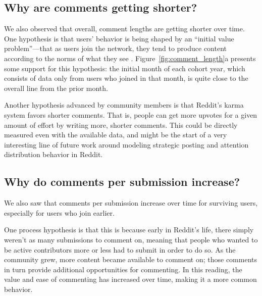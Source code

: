 
\subsection{Why are comments getting shorter?}

We also observed that overall, comment lengths are getting shorter over time.  
One hypothesis is that users' behavior is being shaped by an ``initial value problem''---that as users join the network, they tend to produce content according to the norms of what they see \cite{Kooti2010, Danescu-niculescu-mizil2013}.  
Figure~\ref{fig:comment_length}a presents some support for this hypothesis: the initial month of each cohort year, which consists of data only from users who joined in that month, is quite close to the overall line from the prior month.  

Another hypothesis advanced by community members\cite{RedditHypo1} is that Reddit's karma system favors shorter comments.  That is, people can get more upvotes for a given amount of effort by writing more, shorter comments.  This could be directly measured even with the available data, and might be the start of a very interesting line of future work around modeling strategic posting and attention distribution behavior in Reddit. 

\subsection{Why do comments per submission increase?}

We also saw that comments per submission increase over time for surviving users, especially for users who join earlier.

One process hypothesis is that this is because early in Reddit's life, there simply weren't as many submissions to comment on, meaning that people who wanted to be active contributors more or less had to submit in order to do so. 
As the community grew, more content became available to comment on; those comments in turn provide additional opportunities for commenting.  In this reading, the value and ease of commenting has increased over time, making it a more common behavior. 

